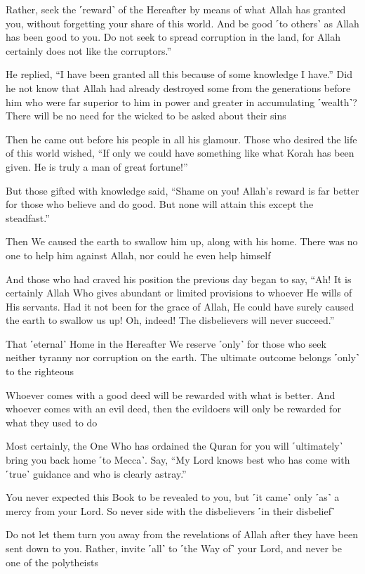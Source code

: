 Rather, seek the ˹reward˺ of the Hereafter by means of what Allah has granted you, without forgetting your share of this world. And be good ˹to others˺ as Allah has been good to you. Do not seek to spread corruption in the land, for Allah certainly does not like the corruptors.”

He replied, “I have been granted all this because of some knowledge I have.” Did he not know that Allah had already destroyed some from the generations before him who were far superior to him in power and greater in accumulating ˹wealth˺? There will be no need for the wicked to be asked about their sins

Then he came out before his people in all his glamour. Those who desired the life of this world wished, “If only we could have something like what Korah has been given. He is truly a man of great fortune!”

But those gifted with knowledge said, “Shame on you! Allah’s reward is far better for those who believe and do good. But none will attain this except the steadfast.”

Then We caused the earth to swallow him up, along with his home. There was no one to help him against Allah, nor could he even help himself

And those who had craved his position the previous day began to say, “Ah! It is certainly Allah Who gives abundant or limited provisions to whoever He wills of His servants. Had it not been for the grace of Allah, He could have surely caused the earth to swallow us up! Oh, indeed! The disbelievers will never succeed.”

That ˹eternal˺ Home in the Hereafter We reserve ˹only˺ for those who seek neither tyranny nor corruption on the earth. The ultimate outcome belongs ˹only˺ to the righteous

Whoever comes with a good deed will be rewarded with what is better. And whoever comes with an evil deed, then the evildoers will only be rewarded for what they used to do

Most certainly, the One Who has ordained the Quran for you will ˹ultimately˺ bring you back home ˹to Mecca˺. Say, “My Lord knows best who has come with ˹true˺ guidance and who is clearly astray.”

You never expected this Book to be revealed to you, but ˹it came˺ only ˹as˺ a mercy from your Lord. So never side with the disbelievers ˹in their disbelief˺

Do not let them turn you away from the revelations of Allah after they have been sent down to you. Rather, invite ˹all˺ to ˹the Way of˺ your Lord, and never be one of the polytheists

